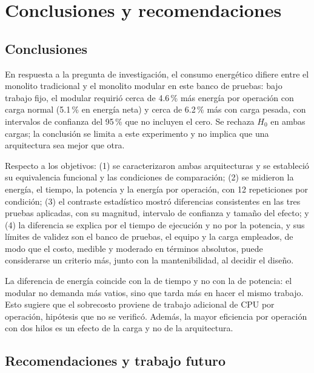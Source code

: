 \chapter{Conclusiones y recomendaciones}
\label{cap:conclusiones}

\section{Conclusiones}

En respuesta a la pregunta de investigación, el consumo energético difiere entre el monolito tradicional y el monolito modular en este banco de pruebas: bajo trabajo fijo, el modular requirió cerca de 4.6\,\% más energía por operación con carga normal (5.1\,\% en energía neta) y cerca de 6.2\,\% más con carga pesada, con intervalos de confianza del 95\,\% que no incluyen el cero. Se rechaza $H_0$ en ambas cargas; la conclusión se limita a este experimento y no implica que una arquitectura sea mejor que otra.

Respecto a los objetivos: (1) se caracterizaron ambas arquitecturas y se estableció su equivalencia funcional y las condiciones de comparación; (2) se midieron la energía, el tiempo, la potencia y la energía por operación, con 12 repeticiones por condición; (3) el contraste estadístico mostró diferencias consistentes en las tres pruebas aplicadas, con su magnitud, intervalo de confianza y tamaño del efecto; y (4) la diferencia se explica por el tiempo de ejecución y no por la potencia, y sus límites de validez son el banco de pruebas, el equipo y la carga empleados, de modo que el costo, medible y moderado en términos absolutos, puede considerarse un criterio más, junto con la mantenibilidad, al decidir el diseño.

La diferencia de energía coincide con la de tiempo y no con la de potencia: el modular no demanda más vatios, sino que tarda más en hacer el mismo trabajo. Esto sugiere que el sobrecosto proviene de trabajo adicional de CPU por operación, hipótesis que no se verificó. Además, la mayor eficiencia por operación con dos hilos es un efecto de la carga y no de la arquitectura.

\section{Recomendaciones y trabajo futuro}
\label{sec:trabajo-futuro}


